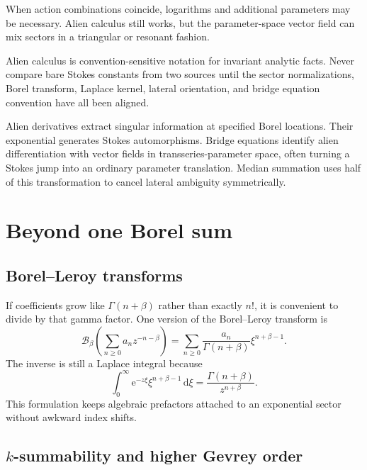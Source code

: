 \documentclass[11pt,oneside]{book}
\theoremstyle{definition}
\theoremstyle{remark}
\newcommand{\Borel}{\mathcal{B}}
\newcommand{\e}{\mathrm{e}}
\newcommand{\dd}{\,\mathrm{d}}
\begin{document}
When action combinations coincide, logarithms and additional parameters may be
necessary. Alien calculus still works, but the parameter-space vector field can
mix sectors in a triangular or resonant fashion.

\begin{warningbox}
Alien calculus is convention-sensitive notation for invariant analytic facts.
Never compare bare Stokes constants from two sources until the sector
normalizations, Borel transform, Laplace kernel, lateral orientation, and bridge
equation convention have all been aligned.
\end{warningbox}

\begin{summarybox}
Alien derivatives extract singular information at specified Borel locations.
Their exponential generates Stokes automorphisms. Bridge equations identify
alien differentiation with vector fields in transseries-parameter space, often
turning a Stokes jump into an ordinary parameter translation. Median summation
uses half of this transformation to cancel lateral ambiguity symmetrically.
\end{summarybox}


\chapter{Beyond one Borel sum}
\label{ch:beyond-one-summability}

\section{Borel--Leroy transforms}

If coefficients grow like $\Gamma(n+\beta)$ rather than exactly $n!$, it is
convenient to divide by that gamma factor. One version of the Borel--Leroy
transform is
\begin{equation}
  \Borel_\beta
  \left(\sum_{n\ge0}a_n z^{-n-\beta}\right)
  =\sum_{n\ge0}\frac{a_n}{\Gamma(n+\beta)}\xi^{n+\beta-1}.
  \label{eq:borel-leroy}
\end{equation}
The inverse is still a Laplace integral because
\[
  \int_0^\infty\e^{-z\xi}\xi^{n+\beta-1}\dd\xi
  =\frac{\Gamma(n+\beta)}{z^{n+\beta}}.
\]
This formulation keeps algebraic prefactors attached to an exponential sector
without awkward index shifts.

\section{\texorpdfstring{$k$}{k}-summability and higher Gevrey order}
\end{document}
